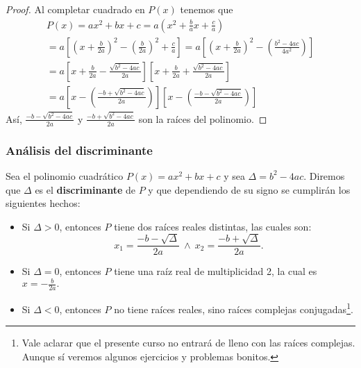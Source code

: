 \begin{proof}
    Al completar cuadrado en $P(x)$ tenemos que
    \begin{gather*}
        P(x) = ax^2 + bx + c = a \left( x^2 + \frac{b}{a}x + \frac{c}{a} \right) \\
        = a \left[ \left( x + \frac{b}{2a} \right)^2 - \left( \frac{b}{2a} \right)^2 + \frac{c}{a} \right]
        = a \left[ \left( x + \frac{b}{2a} \right)^2 - \left( \frac{b^2 - 4ac}{4a^2}\right) \right] \\
        = a \left[ x + \frac{b}{2a} - \frac{\sqrt {b^2 - 4ac}}{2a}\right]\left[ x + \frac{b}{2a} + \frac{\sqrt {b^2 - 4ac}}{2a}\right] \\
        = a \left[ x - \left( \frac{-b + \sqrt {b^2 - 4ac}}{2a} \right) \right]\left[ x - \left( \frac{-b - \sqrt {b^2 - 4ac}}{2a} \right) \right]
    \end{gather*}
    Así, $\frac{-b - \sqrt {b^2 - 4ac}}{2a}$ y $\frac{-b + \sqrt {b^2 - 4ac}}{2a}$ son la raíces del polinomio.
\end{proof}


\subsubsection{Análisis del discriminante}

Sea el polinomio cuadrático $P(x) = ax^2 + bx + c$ y sea $\Delta = b^2 - 4ac$.
Diremos que $\Delta$ es el \textbf{discriminante} de $P$ y que dependiendo de su signo se cumplirán los siguientes hechos:
    \begin{itemize}
        \item Si $\Delta > 0$, entonces $P$ tiene dos raíces reales distintas, las cuales son:
        \[x_1 = \frac{-b - \sqrt{\Delta}}{2a} \ \land \ x_2 = \frac{-b + \sqrt {\Delta}}{2a}.\]
        \item Si $\Delta = 0$, entonces $P$ tiene una raíz real de multiplicidad 2, la cual es $x = -\frac{b}{2a}.$
        \item Si $\Delta < 0$, entonces $P$ no tiene raíces reales, sino raíces complejas conjugadas\footnote{Vale aclarar que el presente curso no entrará de lleno con las raíces complejas.\\Aunque sí veremos algunos ejercicios y problemas bonitos.}.
    \end{itemize}

